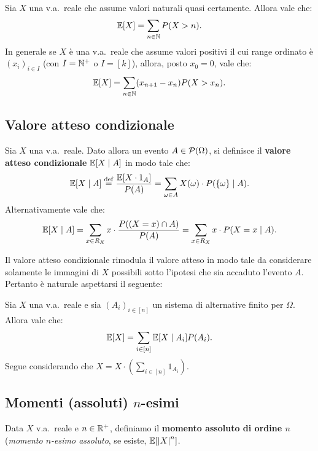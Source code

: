 \begin{multicols*}{2}
\begin{proposition}
    Sia $X$ una v.a.~reale che assume valori naturali quasi certamente.
    Allora vale che:
    \[
        \mathbb{E}[X] = \sum_{n \in \mathbb{N}} P(X > n).
    \]
    In generale se $X$ è una v.a.~reale che assume valori positivi il cui
    range ordinato è $(x_i)_{i \in I}$ (con $I = \mathbb{N}^+$ o $I = [k]$),
    allora, posto $x_0 = 0$, vale che:
    \[
        \mathbb{E}[X] = \sum_{n \in \mathbb{N}} (x_{n+1} - x_n) P(X > x_n).
    \]
\end{proposition}

\subsection{Valore atteso condizionale}

\begin{definition}
    Sia $X$ una v.a.~reale. Dato allora un evento
    $A \in \mathcal{P}(\Omega)$, si definisce il \textbf{valore atteso
    condizionale} $\mathbb{E}[X \mid A]$ in modo tale che:
    \[
        \mathbb{E}[X \mid A] \overset{\mathrm{def}}{=} \frac{\mathbb{E}[X \cdot 1_A]}{P(A)} = \sum_{\omega \in A} X(\omega) \cdot P(\{\omega\} \mid A).
    \]
    Alternativamente vale che:
    \[
        \mathbb{E}[X \mid A] = \sum_{x \in R_X} x \cdot \frac{P((X = x) \cap A)}{P(A)} = \sum_{x \in R_X} x \cdot P(X=x \mid A).
    \]
\end{definition}

Il valore atteso condizionale rimodula il valore atteso in modo
tale da considerare solamente le immagini di $X$ possibili sotto
l'ipotesi che sia accaduto l'evento $A$. Pertanto è naturale
aspettarsi il seguente:

\begin{lemma}
    Sia $X$ una v.a.~reale e sia $(A_i)_{i \in [n]}$ un sistema di alternative
    finito per $\Omega$. Allora vale che:
    \[
        \mathbb{E}[X] = \sum_{i \in [n]} \mathbb{E}[X \mid A_i] P(A_i).
    \]
    Segue considerando che $X = X \cdot (\sum_{i \in [n]} 1_{A_i})$.
\end{lemma}

\subsection{Momenti (assoluti) \texorpdfstring{$n$}{n}-esimi}

\begin{definition}
    Data $X$ v.a.~reale e $n \in \mathbb{R}^+$, definiamo il
    \textbf{momento assoluto di ordine $n$} (\textit{momento
    $n$-esimo assoluto}, se esiste, $\mathbb{E}[\left\lvert X \right\rvert^n]$. \smallskip


\end{definition}
\end{multicols*}
